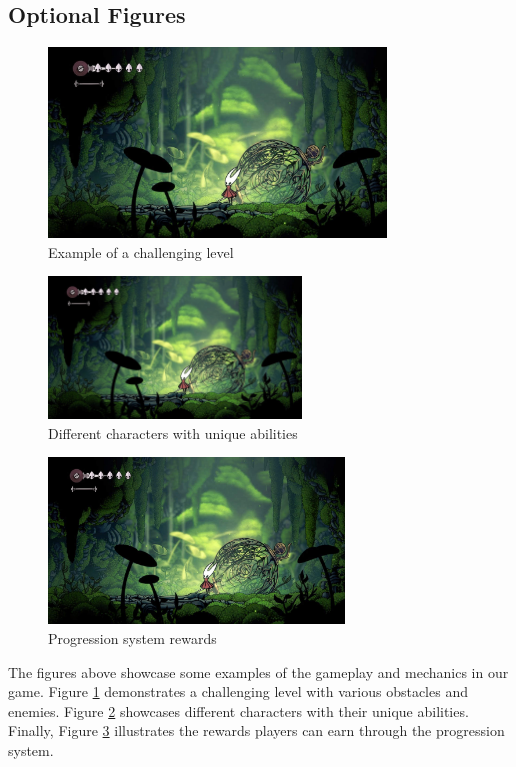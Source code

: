 \subsection{Optional Figures}

\begin{figure}[htbp]
    \centering
    \includegraphics[width=0.8\textwidth]{images/figure1}
    \caption{Example of a challenging level}
    \label{fig:level}
\end{figure}

\begin{figure}[htbp]
    \centering
    \includegraphics[width=0.6\textwidth]{images/figure1}
    \caption{Different characters with unique abilities}
    \label{fig:characters}
\end{figure}

\begin{figure}[htbp]
    \centering
    \includegraphics[width=0.7\textwidth]{images/figure1}
    \caption{Progression system rewards}
    \label{fig:progression}
\end{figure}

The figures above showcase some examples of the gameplay and mechanics in our game. Figure \ref{fig:level} demonstrates a challenging level with various obstacles and enemies. Figure \ref{fig:characters} showcases different characters with their unique abilities. Finally, Figure \ref{fig:progression} illustrates the rewards players can earn through the progression system.

